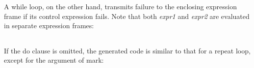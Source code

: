 A while loop, on the other hand, transmits failure to the enclosing
expression frame if its control expression fails. Note that both
\textit{expr1} and \textit{expr2} are evaluated in separate expression
frames:

\begin{center}
\tabletail{}
\tablelasttail{}
\begin{supertabular}{|m{1.9073598in}|m{2.75596in}|}

\end{supertabular}
\end{center}

If the do clause is omitted, the generated code is similar to that for
a repeat loop, except for the argument of mark:

